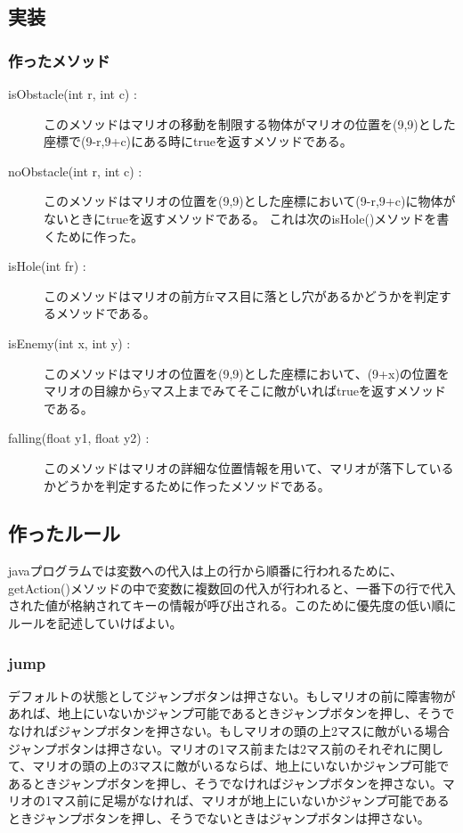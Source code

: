\documentclass{jsarticle}
\begin{document}
\subsection{実装}
\subsubsection{作ったメソッド}

\begin{description}
	\item [isObstacle(int r, int c) :] 
	このメソッドはマリオの移動を制限する物体がマリオの位置を(9,9)とした座標で(9-r,9+c)にある時にtrueを返すメソッドである。

	\item [noObstacle(int r, int c) :] 
	このメソッドはマリオの位置を(9,9)とした座標において(9-r,9+c)に物体がないときにtrueを返すメソッドである。
	これは次のisHole()メソッドを書くために作った。

	\item [isHole(int fr) :]
	このメソッドはマリオの前方frマス目に落とし穴があるかどうかを判定するメソッドである。

	\item [isEnemy(int x, int y) :]
	このメソッドはマリオの位置を(9,9)とした座標において、(9+x)の位置をマリオの目線からyマス上までみてそこに敵がいればtrueを返すメソッドである。

	\item [falling(float y1, float y2) :]
	このメソッドはマリオの詳細な位置情報を用いて、マリオが落下しているかどうかを判定するために作ったメソッドである。

\end{description}

\subsection{作ったルール}
javaプログラムでは変数への代入は上の行から順番に行われるために、getAction()メソッドの中で変数に複数回の代入が行われると、一番下の行で代入された値が格納されてキーの情報が呼び出される。このために優先度の低い順にルールを記述していけばよい。

\subsubsection{jump}
デフォルトの状態としてジャンプボタンは押さない。もしマリオの前に障害物があれば、地上にいないかジャンプ可能であるときジャンプボタンを押し、そうでなければジャンプボタンを押さない。もしマリオの頭の上2マスに敵がいる場合ジャンプボタンは押さない。マリオの1マス前または2マス前のそれぞれに関して、マリオの頭の上の3マスに敵がいるならば、地上にいないかジャンプ可能であるときジャンプボタンを押し、そうでなければジャンプボタンを押さない。マリオの1マス前に足場がなければ、マリオが地上にいないかジャンプ可能であるときジャンプボタンを押し、そうでないときはジャンプボタンは押さない。
\end{document}

